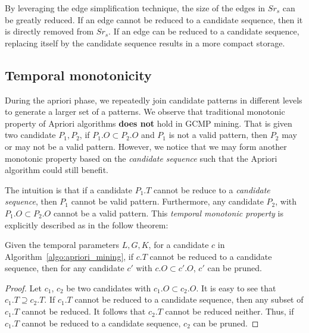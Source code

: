 By leveraging the edge simplification technique, 
the size of the edges in $Sr_s$ can be greatly reduced. If
an edge cannot be reduced to a candidate sequence, then it is directly removed from $Sr_s$.
If an edge can be reduced to a candidate sequence, replacing itself 
by the candidate sequence results in a more compact storage.

%


\subsection{Temporal monotonicity}
During the apriori phase, we repeatedly join candidate patterns in different levels to generate a larger set
of a patterns. We observe that traditional monotonic property of Apriori algorithms \textbf{does not}
hold in GCMP mining. That is given two candidate $P_1, P_2$, if $P_1.O \subset P_2.O$ and $P_1$ is not 
a valid pattern, then $P_2$ may or may not be a valid pattern. However, we notice that
we may form another monotonic property based on the \emph{candidate sequence} such that
the Apriori algorithm could still benefit.

The intuition is that if a candidate $P_1.T$ cannot be reduce to a \emph{candidate sequence}, then $P_1$ cannot 
be valid pattern. Furthermore, any candidate $P_2$, with $P_1.O \subset P_2.O$ cannot be a valid pattern.
This \emph{temporal monotonic property} 
is explicitly described as in the follow theorem:

\begin{theorem}
Given the temporal parameters $L,G,K$, for a candidate $c$ in Algorithm~\ref{algo:apriori_mining},
if $c.T$ cannot be reduced to a candidate sequence, then for any candidate $c'$ with $c.O \subset c'.O$, $c'$ can be pruned.
\end{theorem}
\begin{proof}
Let $c_1$, $c_2$ be two candidates with $c_1.O \subset c_2.O$. It is easy to see that $c_1.T \supseteq c_2.T$.
If $c_1.T$ cannot be reduced to a candidate sequence, then any subset of $c_1.T$ cannot
be reduced. It follows that $c_2.T$ cannot be reduced neither. Thus,
if $c_1.T$ cannot be reduced to a candidate sequence, $c_2$ can be pruned. 
\end{proof}

